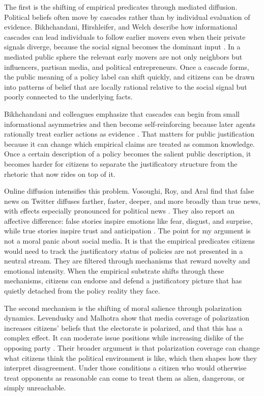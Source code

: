 \documentclass[12pt]{article}
\begin{document}
The first is the shifting of empirical predicates through mediated diffusion. Political beliefs often move by cascades rather than by individual evaluation of evidence. Bikhchandani, Hirshleifer, and Welch describe how informational cascades can lead individuals to follow earlier movers even when their private signals diverge, because the social signal becomes the dominant input \parencite[p.~992]{bikhchandaniHirshleiferWelch1992cascades}. In a mediated public sphere the relevant early movers are not only neighbors but influencers, partisan media, and political entrepreneurs. Once a cascade forms, the public meaning of a policy label can shift quickly, and citizens can be drawn into patterns of belief that are locally rational relative to the social signal but poorly connected to the underlying facts.

Bikhchandani and colleagues emphasize that cascades can begin from small informational asymmetries and then become self-reinforcing because later agents rationally treat earlier actions as evidence \parencite[p.~996]{bikhchandaniHirshleiferWelch1992cascades}. That matters for public justification because it can change which empirical claims are treated as common knowledge. Once a certain description of a policy becomes the salient public description, it becomes harder for citizens to separate the justificatory structure from the rhetoric that now rides on top of it.

Online diffusion intensifies this problem. Vosoughi, Roy, and Aral find that false news on Twitter diffuses farther, faster, deeper, and more broadly than true news, with effects especially pronounced for political news \parencite[p.~1146]{vosoughiRoyAral2018falseNews}. They also report an affective difference: false stories inspire emotions like fear, disgust, and surprise, while true stories inspire trust and anticipation \parencite[p.~1146]{vosoughiRoyAral2018falseNews}. The point for my argument is not a moral panic about social media. It is that the empirical predicates citizens would need to track the justificatory status of policies are not presented in a neutral stream. They are filtered through mechanisms that reward novelty and emotional intensity. When the empirical substrate shifts through these mechanisms, citizens can endorse and defend a justificatory picture that has quietly detached from the policy reality they face.

The second mechanism is the shifting of moral salience through polarization dynamics. Levendusky and Malhotra show that media coverage of polarization increases citizens' beliefs that the electorate is polarized, and that this has a complex effect. It can moderate issue positions while increasing dislike of the opposing party \parencite[pp.~283--284, 291--293]{levendusky2016media}. Their broader argument is that polarization coverage can change what citizens think the political environment is like, which then shapes how they interpret disagreement. Under those conditions a citizen who would otherwise treat opponents as reasonable can come to treat them as alien, dangerous, or simply unreachable.
\end{document}
